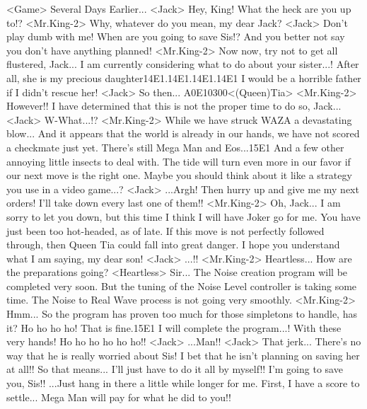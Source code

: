 <Game> Several Days Earlier... 
<Jack> Hey, King! 
What the heck are you up to!? 
<Mr.King-2> Why, whatever do you mean, my dear Jack? 
<Jack> Don't play dumb with me! 
When are you going to save Sis!? 
And you better not say you don't have anything planned! 
<Mr.King-2> Now now, try not to get all flustered, Jack... 
I am currently considering what to do about your sister...! 
After all, she is my precious daughter{14}{E1}.{14}{E1}.{14}{E1}.{14}{E1} 
I would be a horrible father if I didn't rescue her! 
<Jack> So then... 
{A0}{E1}{03}{00}<(Queen)Tia> 
<Mr.King-2> However!! I have determined that this is not the proper time to do so, Jack... 
<Jack> W-What...!? 
<Mr.King-2> While we have struck WAZA a devastating blow... 
And it appears that the world is already in our hands, 
we have not scored a checkmate just yet. 
There's still Mega Man and Eos...{15}{E1} 
And a few other annoying little insects to deal with. 
The tide will turn even more in our favor if our next move is the right one. 
Maybe you should think about it like a strategy you use in a video game...? 
<Jack> ...Argh! 
Then hurry up and give me my next orders! 
I'll take down every last one of them!! 
<Mr.King-2> Oh, Jack... 
I am sorry to let you down, but this time I think I will have Joker go for me. 
You have just been too hot-headed, as of late. 
If this move is not perfectly followed through, then Queen 
Tia could fall into great danger. 
I hope you understand what I am saying, my dear son! 
<Jack> ...!! 
<Mr.King-2> Heartless... 
How are the preparations going? 
<Heartless> Sir... 
The Noise creation program will be completed very soon. 
But the tuning of the Noise Level controller is taking some time. 
The Noise to Real Wave process is not going very smoothly. 
<Mr.King-2> Hmm... 
So the program has proven too much for those simpletons to handle, has it? 
Ho ho ho ho! 
That is fine.{15}{E1} I will complete the program...! 
With these very hands! 
Ho ho ho ho ho ho!! 
<Jack> ...Man!! 
<Jack> That jerk... 
There's no way that he is really worried about Sis! 
I bet that he isn't planning on saving her at all!! 
So that means... 
I'll just have to do it all by myself!! 
I'm going to save you, Sis!! 
...Just hang in there a little while longer for me. 
First, I have a score to settle... 
Mega Man will pay for what he did to you!! 
